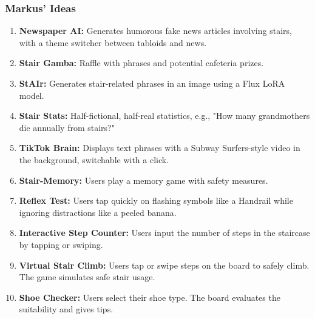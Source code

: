 \documentclass{article}
\begin{document}
\subsubsection{Markus' Ideas}
\begin{enumerate}
    \item \textbf{Newspaper AI:}
        Generates humorous fake news articles involving stairs, with a theme switcher between tabloids and news.
    \item \textbf{Stair Gamba:}
        Raffle with phrases and potential cafeteria prizes.
    \item \textbf{StAIr:}
        Generates stair-related phrases in an image using a Flux LoRA model.
    \item \textbf{Stair Stats:}
        Half-fictional, half-real statistics, e.g., "How many grandmothers die annually from stairs?"
    \item \textbf{TikTok Brain:}
        Displays text phrases with a Subway Surfers-style video in the background, switchable with a click.
    \item \textbf{Stair-Memory:}
        Users play a memory game with safety measures.
    \item \textbf{Reflex Test:}
        Users tap quickly on flashing symbols like a Handrail while ignoring distractions like a peeled banana.
    \item \textbf{Interactive Step Counter:}
        Users input the number of steps in the staircase by tapping or swiping.
    \item \textbf{Virtual Stair Climb:}
        Users tap or swipe steps on the board to safely climb. The game simulates safe stair usage.
    \item \textbf{Shoe Checker:}
        Users select their shoe type. The board evaluates the suitability and gives tips.
\end{enumerate}
\end{document}
